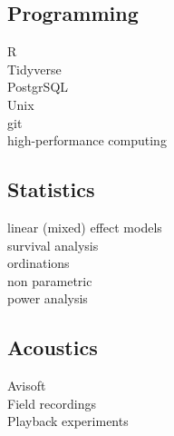 

\begin{minipage}[t]{0.4\textwidth} %


\subsection*{Programming}
\vspace{-8pt}
R\\
Tidyverse\\
PostgrSQL\\
Unix\\
git \\
high-performance computing

\subsection*{Statistics}
\vspace{-8pt}
linear (mixed) effect models \\
survival analysis\\
ordinations\\
non parametric \\
power analysis

\subsection*{Acoustics}
\vspace{-8pt}
Avisoft\\
Field recordings\\
Playback experiments

\end{minipage} %
